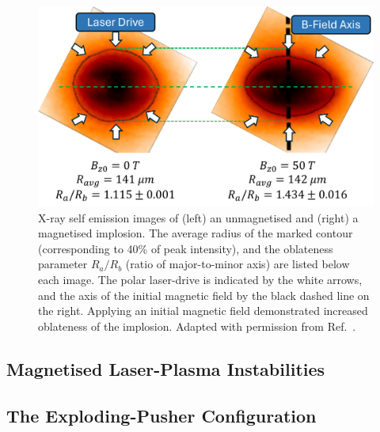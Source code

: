 \begin{figure}[t!]
    \includegraphics[width=0.6\linewidth]{Results2/Images/MagP2_Bose.png}
    \centering
    \caption{X-ray self emission images of (left) an unmagnetised and (right) a magnetised implosion.
    The average radius of the marked contour (corresponding to 40\% of peak intensity), and the oblateness parameter $R_a/R_b$ (ratio of major-to-minor axis) are listed below each image.
    The polar laser-drive is indicated by the white arrows, and the axis of the initial magnetic field by the black dashed line on the right.
    Applying an initial magnetic field demonstrated increased oblateness of the implosion.
    Adapted with permission from Ref.~\cite{bose_effect_2022}.}%
    \label{fig:Res2_Bose_magp2}
\end{figure}


\subsection{Magnetised Laser-Plasma Instabilities}%
\label{sec:Res2_maglpis}



\subsection{The Exploding-Pusher Configuration}%
\label{sec:Res2_expl}



